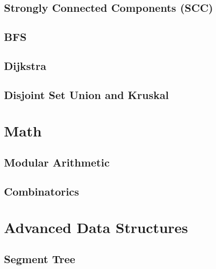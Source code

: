 \documentclass[10pt]{article}
\begin{document}
\begin{landscape}
\begin{multicols}{2}
\subsection{Strongly Connected Components (SCC)}


\subsection{BFS}


\subsection{Dijkstra}


\subsection{Disjoint Set Union and Kruskal}


\section{Math}
\subsection{Modular Arithmetic}


\subsection{Combinatorics}


\section{Advanced Data Structures}
\subsection{Segment Tree}



\end{multicols}
\end{landscape}
\end{document}
